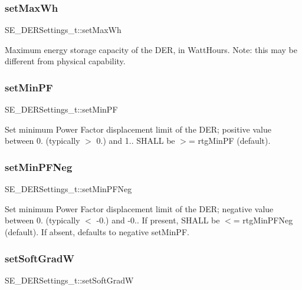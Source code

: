 \subsubsection{\texorpdfstring{set\+Max\+Wh}{setMaxWh}}
{\footnotesize\ttfamily S\+E\+\_\+\+D\+E\+R\+Settings\+\_\+t\+::set\+Max\+Wh}

Maximum energy storage capacity of the D\+ER, in Watt\+Hours. Note\+: this may be different from physical capability. \mbox{\label{group__DERSettings_ga25d7e40750e98570edb457a8b1cac5e7}} 
\subsubsection{\texorpdfstring{set\+Min\+PF}{setMinPF}}
{\footnotesize\ttfamily S\+E\+\_\+\+D\+E\+R\+Settings\+\_\+t\+::set\+Min\+PF}

Set minimum Power Factor displacement limit of the D\+ER; positive value between 0. (typically $>$ 0.) and 1.. S\+H\+A\+LL be $>$= rtg\+Min\+PF (default). \mbox{\label{group__DERSettings_ga7fde7d061c8613af2bd0e09cd23921b5}} 
\subsubsection{\texorpdfstring{set\+Min\+P\+F\+Neg}{setMinPFNeg}}
{\footnotesize\ttfamily S\+E\+\_\+\+D\+E\+R\+Settings\+\_\+t\+::set\+Min\+P\+F\+Neg}

Set minimum Power Factor displacement limit of the D\+ER; negative value between 0. (typically $<$ -\/0.) and -\/0.. If present, S\+H\+A\+LL be $<$= rtg\+Min\+P\+F\+Neg (default). If absent, defaults to negative set\+Min\+PF. \mbox{\label{group__DERSettings_gade867ee1fb03c1773130a0d9a5743584}} 
\subsubsection{\texorpdfstring{set\+Soft\+GradW}{setSoftGradW}}
{\footnotesize\ttfamily S\+E\+\_\+\+D\+E\+R\+Settings\+\_\+t\+::set\+Soft\+GradW}

